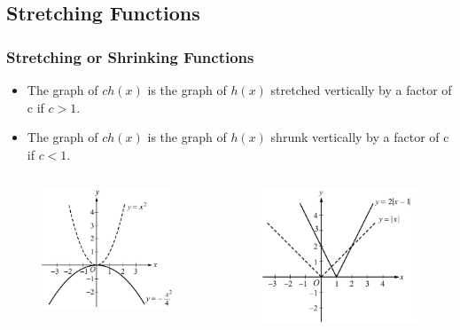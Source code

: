 \documentclass[
	11pt, %
	handout,
]{beamer}
\begin{document}
\subsection{Stretching Functions}
\begin{frame}
	\frametitle{Stretching or Shrinking Functions}
	\begin{theorem}
		\begin{itemize}
			\item The graph of $ch(x)$ is the graph of $h(x)$ stretched vertically by a factor of c if $c > 1$.
			\item The graph of $ch(x)$ is the graph of $h(x)$ shrunk vertically by a factor of c if $c < 1$.
		\end{itemize}
	\end{theorem}

	\begin{columns}[t] 
		\begin{column}{0.5\textwidth} %
				\begin{figure}
					\includegraphics[width=0.6\linewidth]{Shrinking_Functions1.jpg} 
				\end{figure}
		\end{column}
		\begin{column}{0.5\textwidth} %
			\begin{figure}
					\includegraphics[width=0.6\linewidth]{Shrinking_Shifting_Functions1.jpg} 
			\end{figure}
    \end{column}
	\end{columns}
\end{frame}
\end{document}
